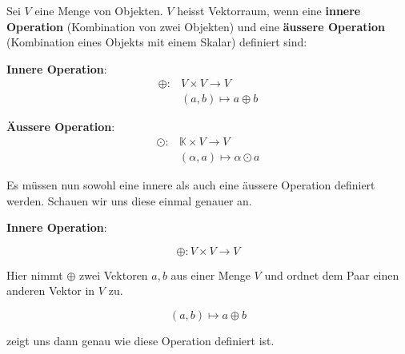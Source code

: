 \begin{tcolorbox}[colback=gray!30, colframe=gray!80, title=Vektorräume]
Sei \( V \) eine Menge von Objekten. \( V \) heisst Vektorraum, wenn eine \textbf{innere Operation} (Kombination von zwei Objekten) und eine \textbf{äussere Operation} (Kombination eines Objekts mit einem Skalar) definiert sind:

\vspace{1\baselineskip}

\textbf{Innere Operation}: 
\begin{equation*}
    \begin{aligned}
        \oplus: &V \times V \rightarrow V \\
        &(a, b) \mapsto a \oplus b 
    \end{aligned}
\end{equation*}

\textbf{Äussere Operation}:
\begin{equation*}
    \begin{aligned}
        \odot: &\mathbb{K} \times V \rightarrow V \\
        &(\alpha, a) \mapsto \alpha \odot a 
    \end{aligned}
\end{equation*}

\end{tcolorbox}

\vspace{1\baselineskip}

Es müssen nun sowohl eine innere als auch eine äussere Operation definiert werden. Schauen wir uns diese einmal genauer an.

\vspace{1\baselineskip}

\textbf{Innere Operation}:

\begin{equation*}
    \oplus: V \times V \rightarrow V 
\end{equation*}

Hier nimmt \( \oplus \) zwei Vektoren \( a, b \) aus einer Menge \( V \) und ordnet dem Paar einen anderen Vektor in \( V \) zu. 

\begin{equation*}
    (a, b) \mapsto a \oplus b
\end{equation*}

zeigt uns dann genau wie diese Operation definiert ist.

\vspace{1\baselineskip}

